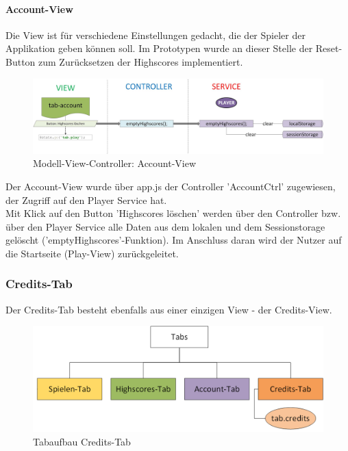 \paragraph{Account-View}
%
%
Die View ist für verschiedene Einstellungen gedacht, die der Spieler der Applikation geben können soll. Im Prototypen wurde an dieser Stelle der Reset-Button zum Zurücksetzen der Highscores implementiert.
%
%
\begin{figure}[h]
\centering
\includegraphics[width=1\textwidth]{ref/images/07-account-tab.png}
\caption[Modell-View-Controller: Account-View]{Modell-View-Controller: Account-View}
\label{fig:MVC:Account-View}
\end{figure}
%
%
Der Account-View wurde über app.js der Controller 'AccountCtrl' zugewiesen, der Zugriff auf den Player Service hat.
\\
Mit Klick auf den Button 'Highscores löschen' werden über den Controller bzw. über den Player Service alle Daten aus dem lokalen und dem Sessionstorage gelöscht ('emptyHighscores'-Funktion). Im Anschluss daran wird der Nutzer auf die Startseite (Play-View) zurückgeleitet.
\subsubsection{Credits-Tab}
Der Credits-Tab besteht ebenfalls aus einer einzigen View - der Credits-View.
\begin{figure}[h]
\centering
\includegraphics[width=1\textwidth]{ref/images/tabs_credits.png}
\caption[Tabaufbau Credits-Tab]{Tabaufbau Credits-Tab}
\label{fig:Tabaufbau Credits-Tab}
\end{figure}

